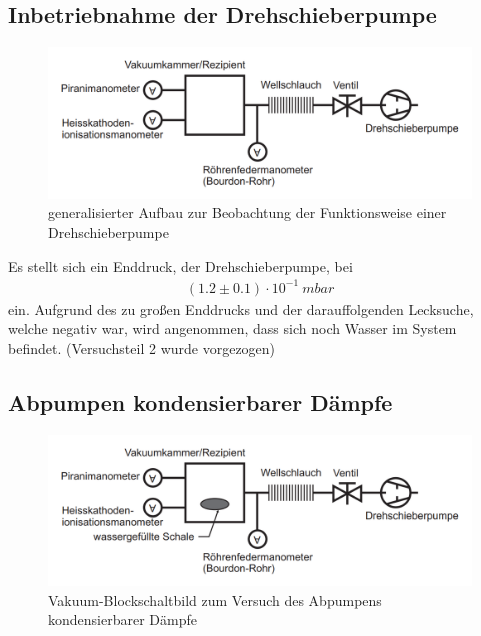\documentclass[12pt, a4paper]{scrartcl}
\begin{document}
	\subsection{Inbetriebnahme der Drehschieberpumpe}
	
        \begin{figure}[H]
            \centering
            \includegraphics[width=.5\paperwidth]{aufbau21}
            \caption{generalisierter Aufbau zur Beobachtung der Funktionsweise einer Drehschieberpumpe}
            \label{fig:anord1}
        \end{figure}
    
    	
    	
    	Es stellt sich ein Enddruck, der Drehschieberpumpe, bei \begin{align*}
            (1.2\pm 0.1)\cdot 10^{-1}\ mbar
        \end{align*}
        ein.
        Aufgrund des zu großen Enddrucks und der darauffolgenden Lecksuche, welche negativ war, wird angenommen, dass sich noch Wasser im System befindet. (Versuchsteil 2 wurde vorgezogen)
    
    
    
    \subsection{Abpumpen kondensierbarer Dämpfe}
    
		\begin{figure}[H]
			\centering
			\includegraphics[width=.5\paperwidth]{aufbau22}
			\caption{Vakuum-Blockschaltbild zum Versuch des Abpumpens kondensierbarer Dämpfe}
            \label{fig:anord2}
		\end{figure}
	
\end{document}
